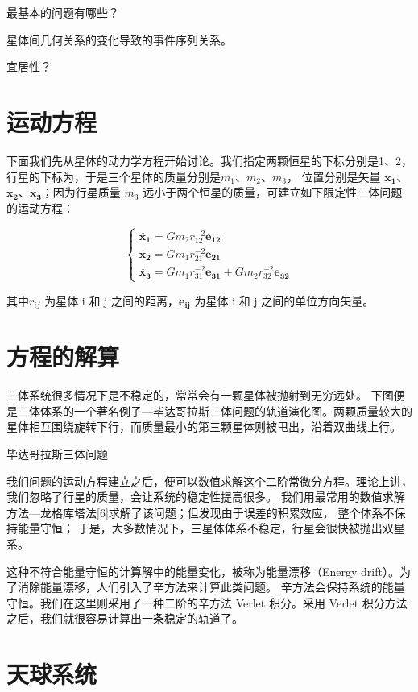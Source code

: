 \documentclass[a4paper,10.5pt]{book}
\begin{document}
最基本的问题有哪些？

星体间几何关系的变化导致的事件序列关系。

宜居性？

\section{运动方程}

下面我们先从星体的动力学方程开始讨论。我们指定两颗恒星的下标分别是1、2，行星的下标为，于是三个星体的质量分别是$m_1$、$m_2$、$m_3$，
位置分别是矢量 $\mathbf{x_1}$、$\mathbf{x_2}$、$\mathbf{x_3}$；因为行星质量 $m_3$ 远小于两个恒星的质量，可建立如下限定性三体问题的运动方程：

$$
\begin{cases}
\ddot{\mathbf{x_1}} = Gm_2r_{12}^{-2} \mathbf{e_{12}}\\
\ddot{\mathbf{x_2}} = Gm_1r_{21}^{-2} \mathbf{e_{21}}\\
\ddot{\mathbf{x_3}} = Gm_1r_{31}^{-2} \mathbf{e_{31}} + Gm_2r_{32}^{-2} \mathbf{e_{32}}
\end{cases}
$$

其中$r_{ij}$ 为星体 i 和 j 之间的距离，$\mathbf{e_{ij}}$ 为星体 i 和 j 之间的单位方向矢量。

\section{方程的解算}

三体系统很多情况下是不稳定的，常常会有一颗星体被抛射到无穷远处。
下图便是三体体系的一个著名例子—毕达哥拉斯三体问题的轨道演化图。两颗质量较大的星体相互围绕旋转下行，而质量最小的第三颗星体则被甩出，沿着双曲线上行。

毕达哥拉斯三体问题

我们问题的运动方程建立之后，便可以数值求解这个二阶常微分方程。理论上讲，我们忽略了行星的质量，会让系统的稳定性提高很多。
我们用最常用的数值求解方法—龙格库塔法[6]求解了该问题；但发现由于误差的积累效应， 整个体系不保持能量守恒；
于是，大多数情况下，三星体体系不稳定，行星会很快被抛出双星系。

这种不符合能量守恒的计算解中的能量变化，被称为能量漂移（Energy drift）。为了消除能量漂移，人们引入了辛方法来计算此类问题。
辛方法会保持系统的能量守恒。我们在这里则采用了一种二阶的辛方法 Verlet 积分。采用 Verlet 积分方法之后，我们就很容易计算出一条稳定的轨道了。

\section{天球系统}
\end{document}
